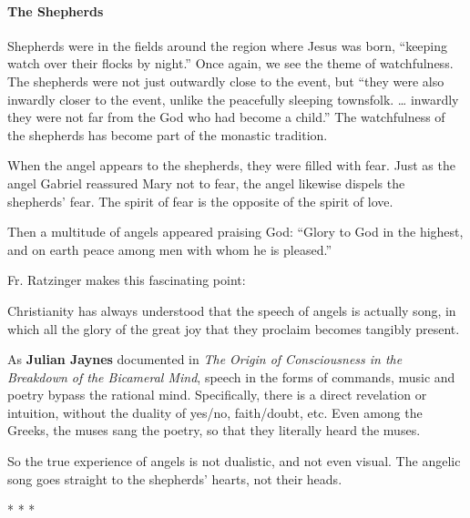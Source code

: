 \paragraph{The Shepherds}
Shepherds were in the fields around the region where Jesus was born, “keeping watch over their flocks by night.” Once again, we see the theme of watchfulness. The shepherds were not just outwardly close to the event, but “they were also inwardly closer to the event, unlike the peacefully sleeping townsfolk. … inwardly they were not far from the God who had become a child.” The watchfulness of the shepherds has become part of the monastic tradition.

When the angel appears to the shepherds, they were filled with fear. Just as the angel Gabriel reassured Mary not to fear, the angel likewise dispels the shepherds' fear. The spirit of fear is the opposite of the spirit of love.

Then a multitude of angels appeared praising God: “Glory to God in the highest, and on earth peace among men with whom he is pleased.”

Fr. Ratzinger makes this fascinating point:

\begin{quotex}
Christianity has always understood that the speech of angels is actually song, in which all the glory of the great joy that they proclaim becomes tangibly present. 

\end{quotex}
As \textbf{Julian Jaynes} documented in \emph{The Origin of Consciousness in the Breakdown of the Bicameral Mind}, speech in the forms of commands, music and poetry bypass the rational mind. Specifically, there is a direct revelation or intuition, without the duality of yes/no, faith/doubt, etc. Even among the Greeks, the muses sang the poetry, so that they literally heard the muses.

So the true experience of angels is not dualistic, and not even visual. The angelic song goes straight to the shepherds' hearts, not their heads.


* * *

